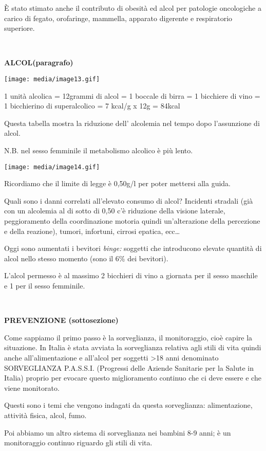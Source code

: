 \documentclass[]{article}
\begin{document}
È stato stimato anche il contributo di obesità ed alcol per patologie
oncologiche a carico di fegato, orofaringe, mammella, apparato digerente
e respiratorio superiore.

\textbf{\\
}

\textbf{ALCOL(paragrafo)}

\texttt{[image: media/image13.gif]}

1 unità alcolica = 12grammi di alcol = 1 boccale di birra = 1 bicchiere
di vino = 1 bicchierino di superalcolico = 7 kcal/g x 12g = 84kcal

Questa tabella mostra la riduzione dell' alcolemia nel tempo dopo
l'assunzione di alcol.

N.B. nel sesso femminile il metabolismo alcolico è più lento.

\texttt{[image: media/image14.gif]}

Ricordiamo che il limite di legge è 0,50g/l per poter mettersi alla
guida.

Quali sono i danni correlati all'elevato consumo di alcol? Incidenti
stradali (già con un alcolemia al di sotto di 0,50 c'è riduzione della
visione laterale, peggioramento della coordinazione motoria quindi
un'alterazione della percezione e della reazione), tumori, infortuni,
cirrosi epatica, ecc\ldots{}

Oggi sono aumentati i bevitori \emph{binge:} soggetti che introducono
elevate quantità di alcol nello stesso momento (sono il 6\% dei
bevitori).

L'alcol permesso è al massimo 2 bicchieri di vino a giornata per il
sesso maschile e 1 per il sesso femminile.

\textbf{\\
}

\textbf{PREVENZIONE (sottosezione)}

Come sappiamo il primo passo è la sorveglianza, il monitoraggio, cioè
capire la situazione. In Italia è stata avviata la sorveglianza relativa
agli stili di vita quindi anche all'alimentazione e all'alcol per
soggetti \textgreater{}18 anni denominato SORVEGLIANZA P.A.S.S.I.
(Progressi delle Aziende Sanitarie per la Salute in Italia) proprio per
evocare questo miglioramento continuo che ci deve essere e che viene
monitorato.

Questi sono i temi che vengono indagati da questa sorveglianza:
alimentazione, attività fisica, alcol, fumo.

Poi abbiamo un altro sistema di sorveglianza nei bambini 8-9 anni; è un
monitoraggio continuo riguardo gli stili di vita.
\end{document}
